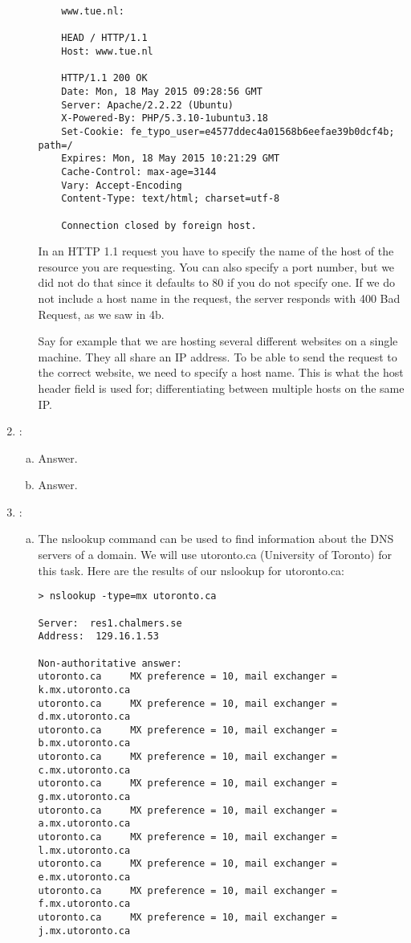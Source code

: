 \documentclass[a4paper,9pt,fleqn]{article}
\begin{document}
\begin{enumerate}[{Task} 1]
\begin{enumerate}[a)]
\begin{lstlisting}
	www.tue.nl:

	HEAD / HTTP/1.1
	Host: www.tue.nl

	HTTP/1.1 200 OK
	Date: Mon, 18 May 2015 09:28:56 GMT
	Server: Apache/2.2.22 (Ubuntu)
	X-Powered-By: PHP/5.3.10-1ubuntu3.18
	Set-Cookie: fe_typo_user=e4577ddec4a01568b6eefae39b0dcf4b; path=/
	Expires: Mon, 18 May 2015 10:21:29 GMT
	Cache-Control: max-age=3144
	Vary: Accept-Encoding
	Content-Type: text/html; charset=utf-8

	Connection closed by foreign host.
\end{lstlisting}

In an HTTP 1.1 request you have to specify the name of the host of the resource
you are requesting. You can also specify a port number, but we did not do that
since it defaults to 80 if you do not specify one. If we do not include a host
name in the request, the server responds with 400 Bad Request, as we saw in 4b.

Say for example that we are hosting several different websites on a single machine.
They all share an IP address. To be able to send the request to the correct
website, we need to specify a host name. This is what the host header field is used
for; differentiating between multiple hosts on the same IP.

\end{enumerate}

\item :
\begin{enumerate}[a)]
\item 
Answer.  
\item 
Answer.
\end{enumerate}

\item :
\begin{enumerate}[a)]
\item 
The {\outp nslookup} command can be used to find information about the DNS servers of a domain.
We will use {\outp utoronto.ca} (University of Toronto) for this task.  Here are the results of
our {\outp nslookup} for {\outp utoronto.ca}:

\begin{lstlisting}
> nslookup -type=mx utoronto.ca
	
Server:  res1.chalmers.se
Address:  129.16.1.53

Non-authoritative answer:
utoronto.ca     MX preference = 10, mail exchanger = k.mx.utoronto.ca
utoronto.ca     MX preference = 10, mail exchanger = d.mx.utoronto.ca
utoronto.ca     MX preference = 10, mail exchanger = b.mx.utoronto.ca
utoronto.ca     MX preference = 10, mail exchanger = c.mx.utoronto.ca
utoronto.ca     MX preference = 10, mail exchanger = g.mx.utoronto.ca
utoronto.ca     MX preference = 10, mail exchanger = a.mx.utoronto.ca
utoronto.ca     MX preference = 10, mail exchanger = l.mx.utoronto.ca
utoronto.ca     MX preference = 10, mail exchanger = e.mx.utoronto.ca
utoronto.ca     MX preference = 10, mail exchanger = f.mx.utoronto.ca
utoronto.ca     MX preference = 10, mail exchanger = j.mx.utoronto.ca


\end{lstlisting}
\end{enumerate}
\end{enumerate}
\end{document}
